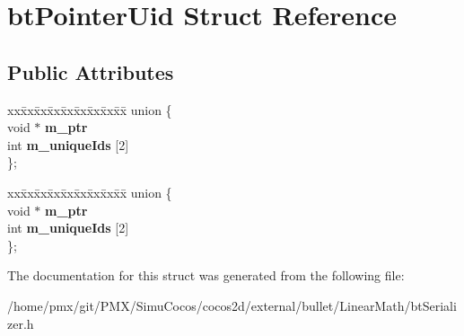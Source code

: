 \hypertarget{structbtPointerUid}{}\section{bt\+Pointer\+Uid Struct Reference}
\label{structbtPointerUid}
\subsection*{Public Attributes}
\begin{DoxyCompactItemize}
\item 
\mbox{\label{structbtPointerUid_acf82ac5c2e513bf4166d9112c6163eb7}} 
\begin{tabbing}
xx\=xx\=xx\=xx\=xx\=xx\=xx\=xx\=xx\=\kill
union \{\\
\>void $\ast$ {\bfseries m\_ptr}\\
\>int {\bfseries m\_uniqueIds} \mbox{[}2\mbox{]}\\
\}; \\

\end{tabbing}\item 
\mbox{\label{structbtPointerUid_a6f8e26a27ae183e7655c89d992b20e98}} 
\begin{tabbing}
xx\=xx\=xx\=xx\=xx\=xx\=xx\=xx\=xx\=\kill
union \{\\
\>void $\ast$ {\bfseries m\_ptr}\\
\>int {\bfseries m\_uniqueIds} \mbox{[}2\mbox{]}\\
\}; \\

\end{tabbing}\end{DoxyCompactItemize}


The documentation for this struct was generated from the following file\+:\begin{DoxyCompactItemize}
\item 
/home/pmx/git/\+P\+M\+X/\+Simu\+Cocos/cocos2d/external/bullet/\+Linear\+Math/bt\+Serializer.\+h\end{DoxyCompactItemize}
